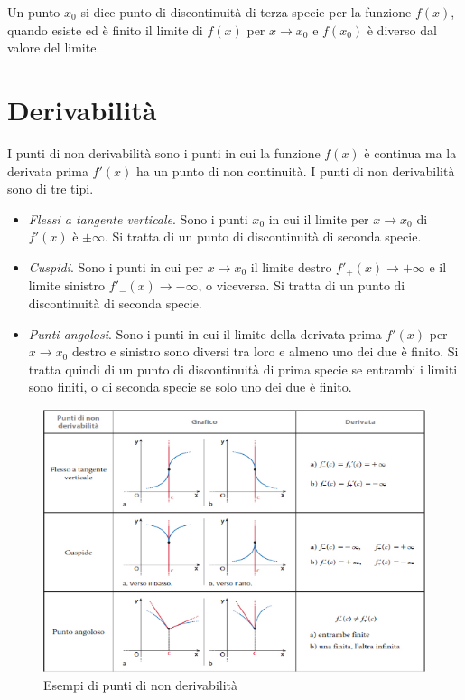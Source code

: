 \documentclass[12pt,twoside]{report}
\begin{document}
\begin{definition}
Un punto $x_0$ si dice punto di discontinuità di terza specie per la funzione $f(x)$, quando esiste ed è finito il limite di $f(x)$ per $x \to x_0$ e $f(x_0)$ è diverso dal valore del limite.
\end{definition}





\section{Derivabilità}
\par{I punti di non derivabilità sono i punti in cui la funzione $f(x)$ è continua ma la derivata prima $f'(x)$ ha un punto di non continuità. I punti di non derivabilità sono di tre tipi.}
\begin{itemize}
    \item \textit{Flessi a tangente verticale}. Sono i punti $x_0$ in cui il limite per $x \to x_0$ di $f'(x)$ è $\pm \infty$. Si tratta di un punto di discontinuità di seconda specie.
    \item \textit{Cuspidi}. Sono i punti in cui per $x \to x_0$  il limite destro $f'_+(x) \to +\infty$ e il limite sinistro $f'_-(x) \to -\infty$, o viceversa. Si tratta di un punto di discontinuità di seconda specie.
    \item \textit{Punti angolosi}. Sono i punti in cui il limite della derivata prima $f'(x)$ per $x \to x_0$ destro e sinistro sono diversi tra loro e almeno uno dei due è finito. Si tratta quindi di un punto di discontinuità di prima specie se entrambi i limiti sono finiti, o di seconda specie se solo uno dei due è finito.
\end{itemize}

\begin{figure}[!h]
\centering
\includegraphics[width = 0.7\hsize]{./figures/nonder}
\caption{Esempi di punti di non derivabilità}
\label{fig:logo}
\end{figure}




\nocite{*}


\end{document}

